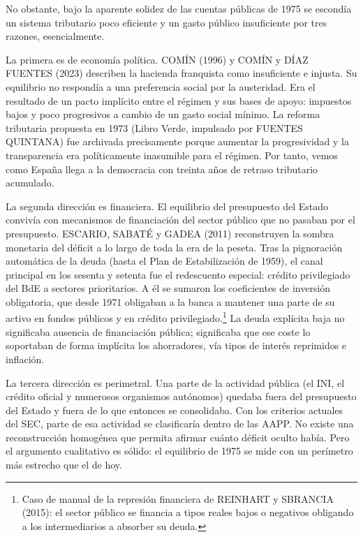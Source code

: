 \documentclass[10pt,a4paper]{article}
\begin{document}
No obstante, bajo la aparente solidez de las cuentas públicas de 1975 se escondía un sistema tributario poco eficiente y un gasto público insuficiente por tres razones, esencialmente.

La primera es de economía política. COMÍN (1996) y COMÍN y DÍAZ FUENTES (2023) describen la hacienda franquista como insuficiente e injusta. Su equilibrio no respondía a una preferencia social por la austeridad. Era el resultado de un pacto implícito entre el régimen y sus bases de apoyo: impuestos bajos y poco progresivos a cambio de un gasto social mínimo. La reforma tributaria propuesta en 1973 (Libro Verde, impulsado por FUENTES QUINTANA) fue archivada precisamente porque aumentar la progresividad y la transparencia era políticamente inasumible para el régimen. Por tanto, vemos como España llega a la democracia con treinta años de retraso tributario acumulado.

La segunda dirección es financiera. El equilibrio del presupuesto del Estado convivía con mecanismos de financiación del sector público que no pasaban por el presupuesto. ESCARIO, SABATÉ y GADEA (2011) reconstruyen la sombra monetaria del déficit a lo largo de toda la era de la peseta. Tras la pignoración automática de la deuda (hasta el Plan de Estabilización de 1959), el canal principal en los sesenta y setenta fue el redescuento especial: crédito privilegiado del BdE a sectores prioritarios. A él se sumaron los coeficientes de inversión obligatoria, que desde 1971 obligaban a la banca a mantener una parte de su activo en fondos públicos y en crédito privilegiado.\footnote{Caso de manual de la represión financiera de REINHART y SBRANCIA (2015): el sector público se financia a tipos reales bajos o negativos obligando a los intermediarios a absorber su deuda.
} La deuda explícita baja no significaba ausencia de financiación pública; significaba que ese coste lo soportaban de forma implícita los ahorradores, vía tipos de interés reprimidos e inflación.

La tercera dirección es perimetral. Una parte de la actividad pública (el INI, el crédito oficial y numerosos organismos autónomos) quedaba fuera del presupuesto del Estado y fuera de lo que entonces se consolidaba. Con los criterios actuales del SEC, parte de esa actividad se clasificaría dentro de las AAPP. No existe una reconstrucción homogénea que permita afirmar cuánto déficit oculto había. Pero el argumento cualitativo es sólido: el equilibrio de 1975 se mide con un perímetro más estrecho que el de hoy.
\end{document}
